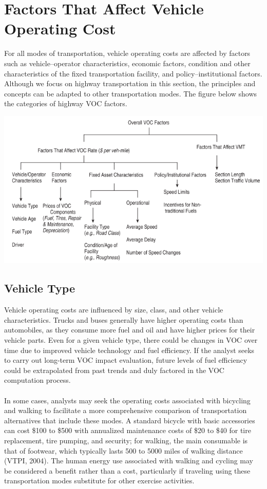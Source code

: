 \section{Factors That Affect Vehicle Operating Cost}
For all modes of transportation, vehicle operating costs are affected by factors such as vehicle–operator characteristics, economic factors, condition and other characteristics of the fixed transportation facility, and policy–institutional factors. Although we focus on highway transportation in this section, the principles and concepts can be adapted to other transportation modes. The figure below shows the categories of highway VOC factors.
\begin{center}
	\includegraphics[scale=0.65]{gfx/fig65.png}
\end{center}
\subsection{Vehicle Type}
Vehicle operating costs are influenced by size, class, and other vehicle characteristics. Trucks and buses generally have higher operating costs than automobiles, as they consume more fuel and oil and have higher prices for their vehicle parts. Even for a given vehicle type, there could be changes in VOC over time due to improved vehicle technology and fuel efficiency. If the analyst seeks to carry out long-term VOC impact evaluation, future levels of fuel efficiency could be extrapolated from past trends and duly factored in the VOC computation process.\\\\
In some cases, analysts may seek the operating costs associated with bicycling and walking to facilitate a more comprehensive comparison of transportation alternatives that include these modes. A standard bicycle with basic accessories can cost \$100 to \$500 with annualized maintenance costs of \$20 to \$40 for tire replacement, tire pumping, and security; for walking, the main consumable is that of footwear, which typically lasts 500 to 5000 miles of walking distance (VTPI, 2004). The human energy use associated with walking and cycling may be considered a benefit rather than a cost, particularly if traveling using these transportation modes substitute for other exercise activities.
